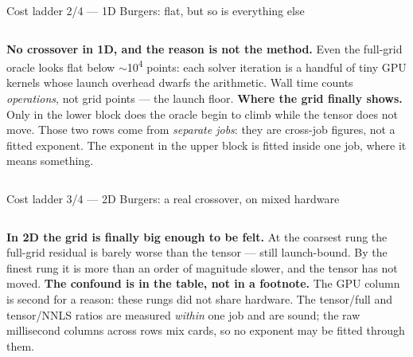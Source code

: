 \documentclass[10pt,aspectratio=169]{beamer}
\begin{document}
\begin{frame}{Cost ladder 2/4 --- 1D Burgers: flat, but so is everything else}
  \centering\scriptsize
  

  \vspace{2mm}
  \begin{columns}[T]
    \footnotesize
    \textbf{No crossover in 1D, and the reason is not the method.} Even the full-grid oracle looks
    flat below $\sim$10\textsuperscript{4} points: each solver iteration is a handful of tiny GPU
    kernels whose launch overhead dwarfs the arithmetic. Wall time counts \emph{operations}, not grid
    points --- the launch floor.
    \footnotesize
    \textbf{Where the grid finally shows.} Only in the lower block does the oracle begin to climb
    while the tensor does not move. Those two rows come from \emph{separate jobs}: they are
    cross-job figures, not a fitted exponent. The exponent in the upper block is fitted inside one
    job, where it means something.
  \end{columns}
\end{frame}

\begin{frame}{Cost ladder 3/4 --- 2D Burgers: a real crossover, on mixed hardware}
  \centering\scriptsize
  

  \vspace{3mm}
  \begin{columns}[T]
    \footnotesize
    \textbf{In 2D the grid is finally big enough to be felt.} At the coarsest rung the full-grid
    residual is barely worse than the tensor --- still launch-bound. By the finest rung it is more
    than an order of magnitude slower, and the tensor has not moved.
    \footnotesize
    \textbf{The confound is in the table, not in a footnote.} The GPU column is second for a reason:
    these rungs did not share hardware. The tensor/full and tensor/NNLS ratios are measured
    \emph{within} one job and are sound; the raw millisecond columns across rows mix cards, so no
    exponent may be fitted through them.
  \end{columns}
\end{frame}
\end{document}
